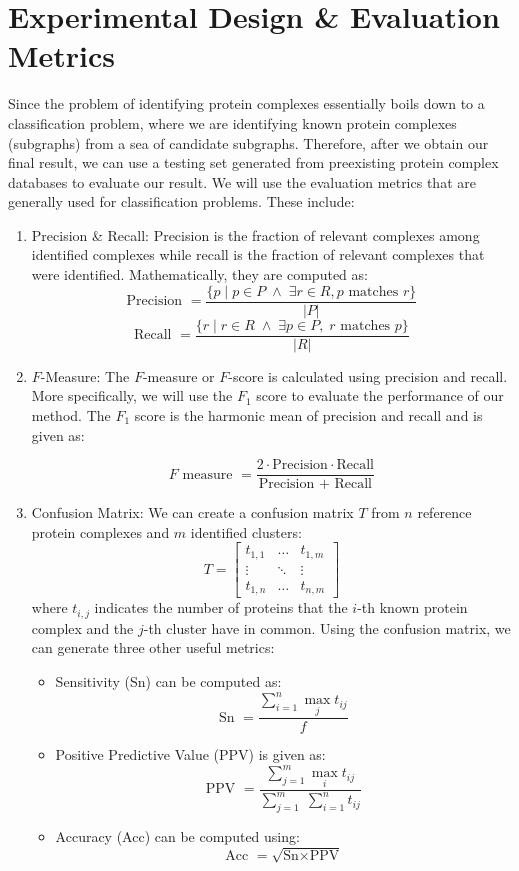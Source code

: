 \section{Experimental Design \& Evaluation Metrics}
Since the problem of identifying protein complexes essentially boils down to a classification 
problem, where we are identifying known protein complexes (subgraphs) from a sea of candidate 
subgraphs. Therefore, after we obtain our final result, we can use a testing set generated from 
preexisting protein complex databases to evaluate our result. We will use the evaluation metrics 
that are generally used for classification problems. These include: 
\begin{enumerate}
\item{Precision \& Recall}: Precision is the fraction of relevant complexes among identified complexes while recall is the fraction of relevant complexes that were identified. Mathematically, they are computed as:
\[\text{Precision } = \frac{\{p \; | \; p \in P \; \wedge \; \exists r \in R, p \text{ matches } r\}}{|P|}\]
\[\text{Recall } = \frac{\{r \; | \; r \in R \; \land \; \exists p \in P, \; r \text{ matches } p\}}{|R|}\]

\item{$F$-Measure}:
The $F$-measure or $F$-score is calculated using precision and recall. More specifically, we will use the $F_1$ 
score to evaluate the performance of our method. The $F_1$ score is the harmonic mean of precision and recall and is given as:

\[F \text{ measure } = \frac{2 \cdot \text{Precision} \cdot \text{Recall}}{\text{Precision } + \text{ Recall}}\]

\item{Confusion Matrix}: We can create a confusion matrix $T$ from $n$ reference protein complexes and $m$ identified clusters:
\[T = \begin{bmatrix}
t_{1,1} & \ldots & t_{1,m} \\ 
\vdots & \ddots & \vdots \\ 
t_{1,n} & \ldots & t_{n,m}  
\end{bmatrix}\]
where $t_{i,j}$ indicates the number of proteins that the $i$-th known protein complex and the 
$j$-th cluster have in common. Using the confusion matrix, we can generate three other useful metrics:
\begin{itemize}
    \item Sensitivity (Sn) can be computed as:
    \[\text{Sn } = \frac{\sum_{i=1}^n \max_j{t_{ij}}}{f}\]
    \item Positive Predictive Value (PPV) is given as:
    \[\text{PPV } = \frac{\sum_{j=1}^m \max_i{t_{ij}}}{\sum_{j=1}^m \; \sum_{i=1}^n t_{ij}}\]
    \item Accuracy (Acc) can be computed using:
    \[\text{Acc } = \sqrt{\text{Sn} \times \text{PPV}}\]
\end{itemize}
\end{enumerate}
